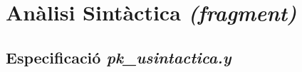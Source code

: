 \section{Anàlisi Sintàctica {\it (fragment)}}

%

\subsection{Especificació \emph{pk\_usintactica.y}}

\newpage
